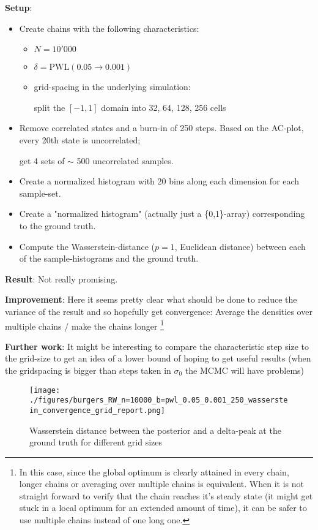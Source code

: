 \documentclass[11pt]{article}
\begin{document}
\begin{enumerate}
\textbf{Setup}:
\begin{itemize}
\item Create chains with the following characteristics:
\begin{itemize}
\item \(N = 10'000\)
\item \(\delta = \text{PWL}(0.05 \to 0.001)\)
\item grid-spacing in the underlying simulation:

split the \([-1, 1]\) domain into 32, 64, 128, 256 cells
\end{itemize}

\item Remove correlated states and a burn-in of 250 steps.
Based on the AC-plot, every 20th state is uncorrelated;

get 4 sets of \(\sim\) 500 uncorrelated samples.

\item Create a normalized histogram with 20 bins along each dimension for each sample-set.

\item Create a "normalized histogram" (actually just a \{0,1\}-array) corresponding to the
ground truth.

\item Compute the Wasserstein-distance (\(p=1\), Euclidean distance) between each of the sample-histograms
and the ground truth.
\end{itemize}

\textbf{Result}: Not really promising.

\textbf{Improvement}: Here it seems pretty clear what should be done to reduce the variance of the result
and so hopefully get convergence: Average the densities over multiple chains / make the chains longer \footnote{In this case, since the global optimum is clearly attained in every chain, longer chains or
averaging over multiple chains is equivalent. When it is not straight forward to verify that the chain
reaches it's steady state (it might get stuck in a local optimum for an extended amount of time), it can
be safer to use multiple chains instead of one long one.


}

\textbf{Further work}: It might be interesting to compare the characteristic step size to the grid-size
to get an idea of a lower bound of hoping to get useful results (when the gridspacing is
bigger than steps taken in \(\sigma_0\) the MCMC will have problems)

\begin{figure}[htbp]
\centering
\texttt{[image: ./figures/burgers\_RW\_n=10000\_b=pwl\_0.05\_0.001\_250\_wasserstein\_convergence\_grid\_report.png]}
\caption{\label{fig:wasserstein_grid}
Wasserstein distance between the posterior and a delta-peak at the ground truth for different grid sizes}
\end{figure}
\end{enumerate}
\end{document}
